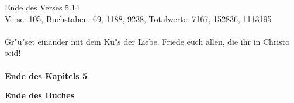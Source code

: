 \documentclass[a4paper,10pt,landscape]{article}
\begin{document}
Ende des Verses 5.14\\
Verse: 105, Buchstaben: 69, 1188, 9238, Totalwerte: 7167, 152836, 1113195\\
\\
Gr"u"set einander mit dem Ku"s der Liebe. Friede euch allen, die ihr in Christo seid!\\
\\
{\bf Ende des Kapitels 5}\\

\bigskip				%

\newpage
\hphantom{x}
\bigskip\bigskip\bigskip\bigskip\bigskip\bigskip
\begin{center}{ \huge {\bf Ende des Buches}}\end{center}
\end{document}
